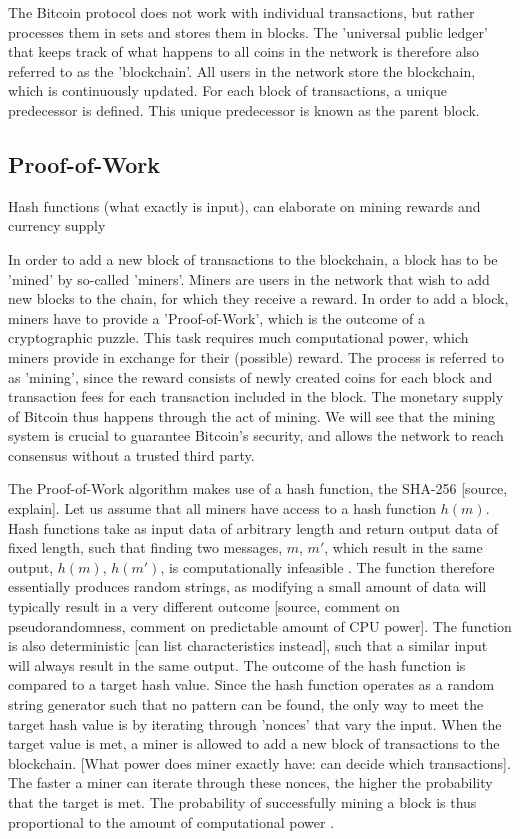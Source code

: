 \bigbreak

The Bitcoin protocol does not work with individual transactions, but rather processes them in sets and stores them in blocks. The 'universal public ledger' that keeps track of what happens to all coins in the network is therefore also referred to as the 'blockchain'. All users in the network store the blockchain, which is continuously updated. For each block of transactions, a unique predecessor is defined. This unique predecessor is known as the parent block.

\subsection{Proof-of-Work}

Hash functions (what exactly is input), can elaborate on mining rewards and currency supply

\bigbreak

In order to add a new block of transactions to the blockchain, a block has to be 'mined' by so-called 'miners'. Miners are users in the network that wish to add new blocks to the chain, for which they receive a reward. In order to add a block, miners have to provide a 'Proof-of-Work', which is the outcome of a cryptographic puzzle. This task requires much computational power, which miners provide in exchange for their (possible) reward. The process is referred to as 'mining', since the reward consists of newly created coins for each block and transaction fees for each transaction included in the block. The monetary supply of Bitcoin thus happens through the act of mining. We will see that the mining system is crucial to guarantee Bitcoin's security, and allows the network to reach consensus without a trusted third party.

\bigbreak

The Proof-of-Work algorithm makes use of a hash function, the SHA-256 [source, explain]. Let us assume that all miners have access to a hash function $h(m)$. Hash functions take as input data of arbitrary length and return output data of fixed length, such that finding two messages, $m$, $m'$, which result in the same output, $h(m)$, $h(m')$, is computationally infeasible \cite{Gilbert2003Hash}. The function therefore essentially produces random strings, as modifying a small amount of data will typically result in a very different outcome [source, comment on pseudorandomness, comment on predictable amount of CPU power]. The function is also deterministic [can list characteristics instead], such that a similar input will always result in the same output. The outcome of the hash function is compared to a target hash value. Since the hash function operates as a random string generator such that no pattern can be found, the only way to meet the target hash value is by iterating through 'nonces' that vary the input. When the target value is met, a miner is allowed to add a new block of transactions to the blockchain. [What power does miner exactly have: can decide which transactions]. The faster a miner can iterate through these nonces, the higher the probability that the target is met. The probability of successfully mining a block is thus proportional to the amount of computational power \cite{Brown2018Formal}.

